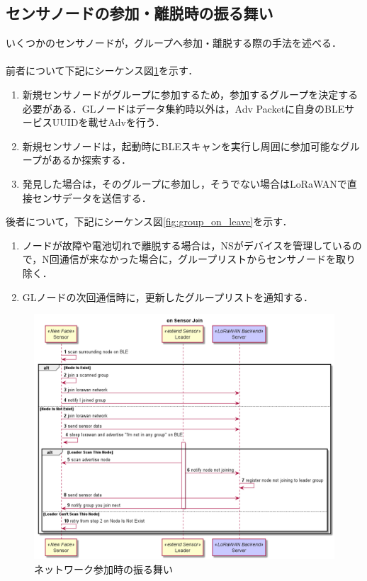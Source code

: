 \subsection{センサノードの参加・離脱時の振る舞い}
いくつかのセンサノードが，グループへ参加・離脱する際の手法を述べる．\\ \\
前者について下記にシーケンス図\ref{fig:group_on_join}を示す．

\begin{enumerate}
    \item 新規センサノードがグループに参加するため，参加するグループを決定する必要がある．GLノードはデータ集約時以外は，Adv Packetに自身のBLEサービスUUIDを載せAdvを行う．
    \item 新規センサノードは，起動時にBLEスキャンを実行し周囲に参加可能なグループがあるか探索する．
    \item 発見した場合は，そのグループに参加し，そうでない場合はLoRaWANで直接センサデータを送信する．
\end{enumerate}

後者について，下記にシーケンス図\ref{fig:group_on_leave}を示す．

\begin{enumerate}
    \item ノードが故障や電池切れで離脱する場合は，NSがデバイスを管理しているので，N回通信が来なかった場合に，グループリストからセンサノードを取り除く．
    \item GLノードの次回通信時に，更新したグループリストを通知する．
\end{enumerate}

\begin{figure}[]
    \begin{center}
    \includegraphics[width=14cm]{figures/グループ化_ネットワーク参加時.png}
    \caption{ネットワーク参加時の振る舞い}
    \label{fig:group_on_join}
    \end{center}
\end{figure}


